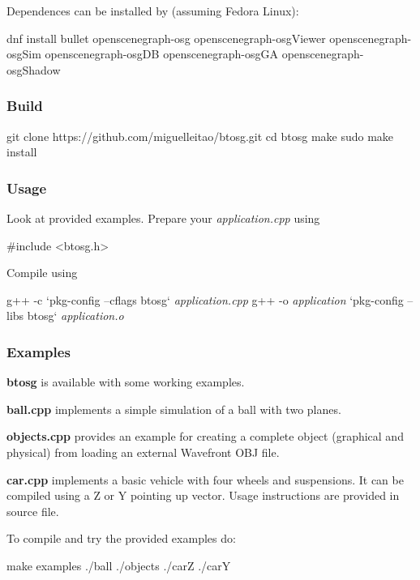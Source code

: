Dependences can be installed by (assuming Fedora Linux)\+: \begin{DoxyVerb}dnf install bullet openscenegraph-osg openscenegraph-osgViewer openscenegraph-osgSim openscenegraph-osgDB openscenegraph-osgGA openscenegraph-osgShadow
\end{DoxyVerb}


\subsubsection*{Build}

\begin{DoxyVerb}git clone https://github.com/miguelleitao/btosg.git
cd btosg
make
sudo make install
\end{DoxyVerb}


\subsubsection*{Usage}

Look at provided examples. Prepare your {\itshape application.\+cpp} using \begin{DoxyVerb}#include <btosg.h>
\end{DoxyVerb}


Compile using 
\begin{DoxyPre}
g++ -c `pkg-config --cflags btosg` {\itshape application.cpp}
g++ -o {\itshape application} `pkg-config --libs btosg` {\itshape application.o}
\end{DoxyPre}
 \subsubsection*{Examples}

{\bfseries btosg} is available with some working examples.
\begin{DoxyItemize}
\item {\bfseries ball.\+cpp} implements a simple simulation of a ball with two planes.
\item {\bfseries objects.\+cpp} provides an example for creating a complete object (graphical and physical) from loading an external Wavefront O\+BJ file.
\item {\bfseries car.\+cpp} implements a basic vehicle with four wheels and suspensions. It can be compiled using a Z or Y pointing up vector. Usage instructions are provided in source file.
\end{DoxyItemize}

To compile and try the provided examples do\+: \begin{DoxyVerb}make examples 
./ball
./objects
./carZ
./carY\end{DoxyVerb}
 